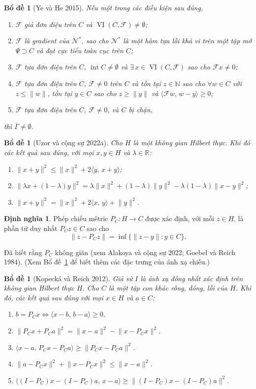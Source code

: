 \documentclass[11pt,a4paper]{article}
\theoremstyle{plain}
\newtheorem{lemma}[theorem]{Bổ đề}
\theoremstyle{definition}
\newtheorem{definition}[theorem]{Định nghĩa}
\theoremstyle{remark}
\numberwithin{equation}{section}
\newcommand{\Fc}{\mathcal{F}}
\newcommand{\Nc}{\mathcal{N}}
\newcommand{\inp}[2]{\langle #1,\,#2\rangle}
\newcommand{\nm}[1]{\lVert #1\rVert}
\newcommand{\R}{\mathbb{R}}
\newcommand{\N}{\mathbb{N}}
\DeclareMathOperator{\VI}{VI}
\newcommand{\Gam}{\bar{\Gamma}}
\begin{document}
\begin{lemma}[Ye và He 2015]\label{lem:2.4}
Nếu một trong các điều kiện sau đúng,
\begin{enumerate}[label=(\roman*)]
\item $\Fc$ giả đơn điệu trên $C$ và $\VI(C,\Fc)\ne\emptyset$;
\item $\Fc$ là gradient của $\Nc^{*}$, sao cho $\Nc^{*}$ là một hàm tựa lồi khả vi trên một tập mở $\Psi\supset C$ và đạt cực tiểu toàn cục trên $C$;
\item $\Fc$ tựa đơn điệu trên $C$, $\operatorname{int}C\ne\emptyset$ và $\exists\,x\in\VI(C,\Fc)$ sao cho $\Fc x\ne 0$;
\item $\Fc$ tựa đơn điệu trên $C$, $\Fc\ne 0$ trên $C$ và tồn tại $z\in\N$ sao cho $\forall w\in C$ với $z\le\nm{w}$, tồn tại $y\in C$ sao cho $z\ge\nm{y}$ và $\inp{\Fc w}{w-y}\ge 0$;
\item $\Fc$ tựa đơn điệu trên $C$, $\Fc\ne 0$, và $C$ bị chặn,
\end{enumerate}
thì $\Gam\ne\emptyset$.
\end{lemma}

\begin{lemma}[Uzor và cộng sự 2022a]\label{lem:2.5}
Cho $H$ là một không gian Hilbert thực. Khi đó các kết quả sau đúng, với mọi $x,y\in H$ và $\lambda\in\R$:
\begin{enumerate}[label=(\roman*)]
\item $\nm{x+y}^2\le\nm{x}^2+2\inp{y}{x+y}$;
\item $\nm{\lambda x+(1-\lambda)y}^2=\lambda\nm{x}^2+(1-\lambda)\nm{y}^2-\lambda(1-\lambda)\nm{x-y}^2$;
\item $\nm{x+y}^2=\nm{x}^2+2\inp{x}{y}+\nm{y}^2$.
\end{enumerate}
\end{lemma}

\begin{definition}
Phép chiếu mêtric $P_C:H\to C$ được xác định, với mỗi $z\in H$, là phần tử duy nhất $P_Cz\in C$ sao cho
\[
\nm{z-P_Cz}=\inf\{\nm{z-y}:y\in C\}.
\]
\end{definition}
Đã biết rằng $P_C$ không giãn (xem Alakoya và cộng sự 2022; Goebel và Reich 1984). (Xem Bổ đề~\ref{lem:2.7} để biết thêm các đặc trưng của ánh xạ chiếu.)

\begin{lemma}[Kopecká và Reich 2012]\label{lem:2.7}
Giả sử $I$ là ánh xạ đồng nhất xác định trên không gian Hilbert thực $H$. Cho $C$ là một tập con khác rỗng, đóng, lồi của $H$. Khi đó, các kết quả sau đúng với mọi $x\in H$ và $a\in C$:
\begin{enumerate}[label=(\roman*)]
\item $b=P_Cx\iff\inp{x-b}{b-a}\ge 0$.
\item $\nm{P_Cx+P_Ca}^2=\nm{x-a}^2-\nm{x-P_Cx}^2$.
\item $\inp{x-a}{P_Cx-P_Ca}\ge\nm{P_Cx-P_Ca}^2$.
\item $\nm{a-P_Cx}^2+\nm{x-P_Cx}^2\le\nm{x-a}^2$.
\item $\inp{(I-P_C)x-(I-P_C)a}{x-a}\ge\nm{(I-P_C)x-(I-P_C)a}^2$.
\end{enumerate}
\end{lemma}
\end{document}
